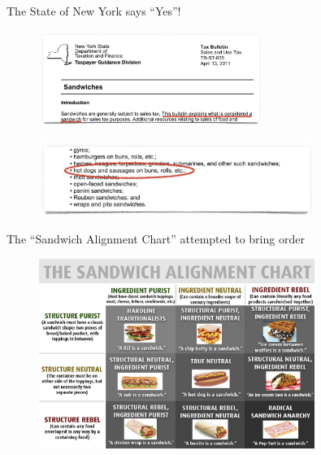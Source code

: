 \documentclass{beamer}
\begin{document}
\begin{frame}{The State of New York says ``Yes''!}
    \begin{figure}
        \includegraphics[width=0.65\textwidth]{ny_sandwich_law_1.jpg}
        \label{fig:ny-sandwich-law-top}
    \end{figure}
    \begin{figure}
        \includegraphics[width=0.8\textwidth]{ny_sandwich_law_2.jpg}
        \label{fig:ny-sandwich-law-bottom}
    \end{figure}
\end{frame}

\begin{frame}{The ``Sandwich Alignment Chart'' attempted to bring order}
    \begin{figure}
        \includegraphics[width=0.8\textwidth]{sandwich_alignment.jpg}
        \label{fig:sandwich-alignment}
    \end{figure}
\end{frame}
\end{document}
